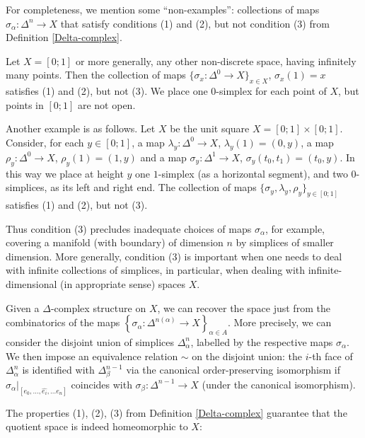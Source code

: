 \documentclass[11pt,a4paper]{report}
\begin{document}
	  For completeness, we mention  some ``non-examples'': collections of maps $\sigma_\alpha:\Delta^n\to X$ that satisfy conditions (1) and (2), but not condition (3) from Definition \ref{Delta-complex}.
     \begin{Ex}
     	Let $X=[0;1]$ or more generally, any other non-discrete space, having infinitely many points. Then the collection
     	of  maps $\{\sigma_x:\Delta^0\to X\}_{x\in X}$, $\sigma_x(1)=x$ 
     	satisfies (1) and (2), but not (3). We place  one $0$-simplex for each point of $X$, but  points in $[0;1]$ are not open.
     	
     	Another  example is as follows. Let $X$ be the unit square $X=[0;1]\times [0;1]$. Consider, for each $y\in [0;1]$, a  map
     	$\lambda_y:\Delta^0\to X$, $\lambda_y(1)=(0,y)$, a map $\rho_y:\Delta^0\to X$, $\rho_y(1)=(1,y)$ and a map
     	$\sigma_y:\Delta^1\to X$, $\sigma_y(t_0,t_1)= (t_0,y)$. In this way we place  at height $y$ one $1$-simplex (as a horizontal segment), 
     	and two $0$-simplices, as its left and right end. The collection of maps $\{\sigma_y, \lambda_y, \rho_y\}_{y\in[0;1]}$ satisfies (1) and (2), 
     	but not (3).
     \end{Ex}
	  Thus condition (3) precludes inadequate choices of maps $\sigma_\alpha$, for example, covering a manifold (with boundary) of dimension $n$ by simplices
	  of smaller dimension.
	  More generally, condition (3) is important when one needs to deal with  infinite collections of simplices, in particular, when dealing with
	  infinite-dimensional (in appropriate sense) spaces $X$.
	  
	  
	  
	  Given a $\Delta$-complex structure on $X$, we can recover the space just from the combinatorics of the maps $\left\{\sigma_\alpha:\Delta^{n(\alpha)}\to X\right\}_{\alpha\in A}$.
	  More precisely, we can consider the disjoint union of  simplices $\Delta_\alpha^n$, labelled by the respective maps $\sigma_\alpha$. We then impose an
	  equivalence relation $\sim$ on the disjoint union: the $i$-th face of $\Delta^n_\alpha$ is identified with $\Delta^{n-1}_\beta$ 
	  via the canonical order-preserving isomorphism
	  if $\left. \sigma_\alpha\right|_{[e_0,\ldots, \widehat{e_i},\ldots e_n]}$
	  coincides with $\sigma_\beta:\Delta^{n-1}\to X$ (under the canonical isomorphism).
	  
	  The properties (1), (2), (3) from Definition \ref{Delta-complex} guarantee that the quotient space is indeed homeomorphic to $X$:
	  
\end{document}
